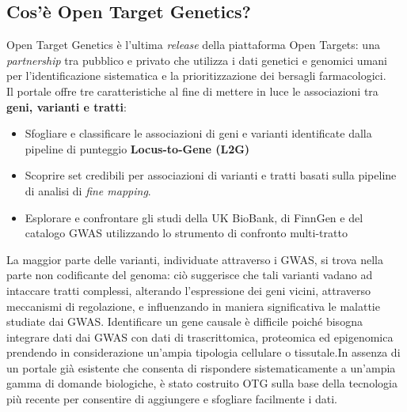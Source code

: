 \documentclass{article}
\begin{document}
\subsection{Cos'è Open Target Genetics?}
Open Target Genetics è l'ultima \textit{release} della piattaforma Open Targets: una \textit{partnership} tra pubblico e privato che utilizza i dati genetici e genomici umani per l'identificazione sistematica e la prioritizzazione dei bersagli farmacologici.\\
Il portale offre tre caratteristiche al fine di mettere in luce le associazioni tra \textbf{geni, varianti e tratti}:
\begin{itemize}
    \item Sfogliare e classificare le associazioni di geni e varianti identificate dalla pipeline di punteggio \textbf{Locus-to-Gene (L2G)}
    \item Scoprire set credibili per associazioni di varianti e tratti basati sulla pipeline di analisi di \textit{fine mapping}.
    \item Esplorare e confrontare gli studi della UK BioBank, di FinnGen e del catalogo GWAS utilizzando lo strumento di confronto multi-tratto
\end{itemize} 

\begin{box3}
    [title={\textbf{La novità di OTG}}]
    {La maggior parte delle varianti, individuate attraverso i GWAS, si trova nella parte non codificante del genoma: ciò suggerisce che tali varianti vadano ad intaccare tratti complessi, alterando l'espressione dei geni vicini, attraverso meccanismi di regolazione, e influenzando in maniera significativa le malattie studiate dai GWAS. 
    Identificare un gene causale è difficile poiché bisogna integrare dati dai GWAS con dati di trascrittomica, proteomica ed epigenomica prendendo in considerazione un'ampia tipologia cellulare o tissutale.In assenza di un portale già esistente che consenta di rispondere sistematicamente a un'ampia gamma di domande biologiche, è stato costruito OTG sulla base della tecnologia più recente per consentire di aggiungere e sfogliare facilmente i dati.}
\end{box3}
\end{document}
